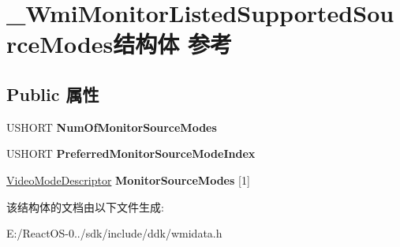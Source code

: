 \hypertarget{struct___wmi_monitor_listed_supported_source_modes}{}\section{\+\_\+\+Wmi\+Monitor\+Listed\+Supported\+Source\+Modes结构体 参考}
\label{struct___wmi_monitor_listed_supported_source_modes}
\subsection*{Public 属性}
\begin{DoxyCompactItemize}
\item 
\mbox{\label{struct___wmi_monitor_listed_supported_source_modes_a19bcd962ff5b13c6d9e60450ba36f094}} 
U\+S\+H\+O\+RT {\bfseries Num\+Of\+Monitor\+Source\+Modes}
\item 
\mbox{\label{struct___wmi_monitor_listed_supported_source_modes_a06554f62bc19a9640f0a70b22c894341}} 
U\+S\+H\+O\+RT {\bfseries Preferred\+Monitor\+Source\+Mode\+Index}
\item 
\mbox{\label{struct___wmi_monitor_listed_supported_source_modes_a1d39625502759ed818eaa2f0c14abead}} 
\hyperlink{struct___video_mode_descriptor}{Video\+Mode\+Descriptor} {\bfseries Monitor\+Source\+Modes} \mbox{[}1\mbox{]}
\end{DoxyCompactItemize}


该结构体的文档由以下文件生成\+:\begin{DoxyCompactItemize}
\item 
E\+:/\+React\+O\+S-\/0../sdk/include/ddk/wmidata.\+h\end{DoxyCompactItemize}
